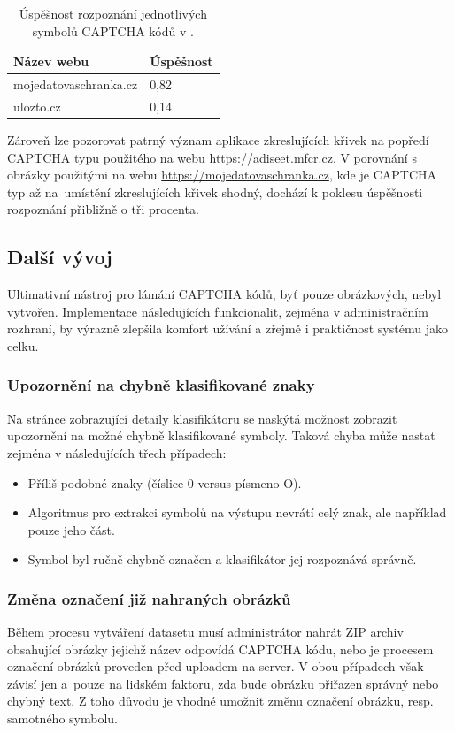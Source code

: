 \documentclass[
  field=ainfp,
  master=true,
  biblatex,
  sourcecodes=false,
  theorems=false,
  glossaries,
  index
]{kidiplom}
\begin{document}
\begin{table}[H]
\centering
\begin{tabular}{|l|l|}
\hline
\textbf{Název webu} & \textbf{Úspěšnost}
\\ \hline
mojedatovaschranka.cz & 0,82
\\ \hline
ulozto.cz & 0,14
\\ \hline
\end{tabular}
\caption{Úspěšnost rozpoznání jednotlivých symbolů CAPTCHA kódů v \citep{Kopp2016HowTM}.}
\label{succesful_rate_mimic}
\end{table}

Zároveň lze pozorovat patrný význam aplikace zkreslujících křivek na popředí CAPT\-CHA typu použitého na webu \url{https://adiseet.mfcr.cz}. V porov\-nání s ob\-rázky použitými na webu \url{https://mojedatovaschranka.cz}, kde je CAPTCHA typ až na~umístění zkreslujících křivek shodný, dochází k poklesu úspěšnosti rozpoznání přibližně o  tři procenta.

\subsection{Další vývoj}
Ultimativní nástroj pro lámání CAPTCHA kódů, byť pouze obrázkových, nebyl vytvořen. Implementace následujících funkcionalit, zejména v administračním rozhraní, by výrazně zlepšila komfort užívání a zřejmě i praktičnost systému jako celku.

\subsubsection*{Upozornění na chybně klasifikované znaky} 
Na stránce zobrazující detaily klasifikátoru se naskýtá možnost zobrazit upozornění na možné chybně klasifikované symboly. Taková chyba může nastat zej\-ména v následujících třech případech: 
\begin{itemize}
\item Příliš podobné znaky (číslice 0 versus písmeno O).
\item Algoritmus pro extrakci symbolů na výstupu nevrátí celý znak, ale napří\-klad pouze jeho část.
\item Symbol byl ručně chybně označen a klasifikátor jej rozpoznává správně.
\end{itemize}

\subsubsection*{Změna označení již nahraných obrázků} 
Během procesu vytváření datasetu musí administrátor nahrát ZIP archiv obsahující obrázky jejichž název odpovídá CAPTCHA kódu, nebo je procesem označení obrázků proveden před uploadem na server. V obou případech však závisí jen a~pouze na lidském faktoru, zda bude obrázku přiřazen správný nebo chybný text. Z toho důvodu je vhodné umožnit změnu označení obrázku, resp. samotného symbolu.
\end{document}
